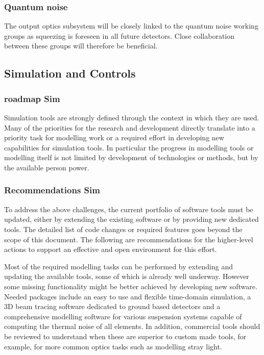 \subsubsection{\bf Quantum noise} The output optics subsystem will be closely linked to the quantum noise working groups as squeezing is foreseen in all future detectors. Close collaboration between these groups will therefore be beneficial.

\subsection{Simulation and Controls}
\subsubsection{roadmap Sim}
Simulation tools are strongly defined through the context in which they are used. Many of the priorities for the research and development directly translate into a priority task for modelling work or a required effort in developing new capabilities for simulation tools. In particular the progress in modelling tools or modelling itself is not limited by development of technologies or methods, but by the available person power.

\subsubsection{Recommendations Sim}
To address the above challenges, the current portfolio of software tools must be updated, either by extending the existing software or by providing new dedicated tools. The detailed list of code changes or required features goes beyond the scope of this document. The following are recommendations for the higher-level actions to support an effective and open environment for this effort.

Most of the required modelling tasks can be performed by extending and updating the available tools, some of which is already well underway. However some missing functionality might be better achieved by developing new software. Needed packages include an easy to use and flexible time-domain simulation, a 3D beam tracing software dedicated to ground based detectors and a comprehensive modelling software for various suspension systems capable of computing the thermal noise of all elements. In addition, commercial tools should be reviewed to understand when these are superior to custom made tools, for example, for more common optics tasks such as modelling stray light.

